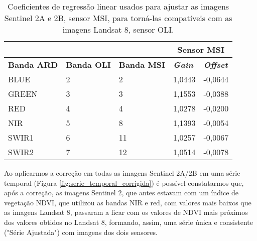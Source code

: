\begin{table}[H]
\caption{Coeficientes de regressão linear usados para ajustar as imagens Sentinel 2A e 2B, sensor MSI, para torná-las compatíveis com as imagens Landsat 8, sensor OLI.}
\label{tab:coeficientes_ajuste_histograma}
\centering
\begin{adjustbox}{width=0.5\textwidth}
\begin{tabular}{lll|l|l|}
\cline{4-5}
                                         &                                         &                    & \multicolumn{2}{c|}{\textbf{Sensor MSI}} \\ \hline
\multicolumn{1}{|l|}{\textbf{Banda ARD}} & \multicolumn{1}{l|}{\textbf{Banda OLI}} & \textbf{Banda MSI} & \textbf{\textit{Gain}}     & \textbf{\textit{Offset}}     \\ \hline
\multicolumn{1}{|l|}{BLUE}               & \multicolumn{1}{l|}{2}                  & 2                  & 1,0443             & -0,0644             \\ \hline
\multicolumn{1}{|l|}{GREEN}              & \multicolumn{1}{l|}{3}                  & 3                  & 1,1553             & -0,0388             \\ \hline
\multicolumn{1}{|l|}{RED}                & \multicolumn{1}{l|}{4}                  & 4                  & 1,0278             & -0,0200             \\ \hline
\multicolumn{1}{|l|}{NIR}                & \multicolumn{1}{l|}{5}                  & 8                  & 1,1393             & -0,0054             \\ \hline
\multicolumn{1}{|l|}{SWIR1}              & \multicolumn{1}{l|}{6}                  & 11                 & 1,0257             & -0,0067             \\ \hline
\multicolumn{1}{|l|}{SWIR2}              & \multicolumn{1}{l|}{7}                  & 12                 & 1,0514             & -0,0078             \\ \hline
\end{tabular}
\end{adjustbox}
\end{table}

Ao aplicarmos a correção em todas as imagens Sentinel 2A/2B em uma série temporal (Figura \ref{fig:serie_temporal_corrigida}) é possível constatarmos que, após a correção, as imagens Sentinel 2, que antes estavam com um índice de vegetação NDVI, que utilizou as bandas NIR e red, com valores mais baixos que as imagens Landsat 8, passaram a ficar com os valores de NDVI mais próximos dos valores obtidos no Landsat 8, formando, assim, uma série única e consistente ("Série Ajustada") com imagens dos dois sensores.     

